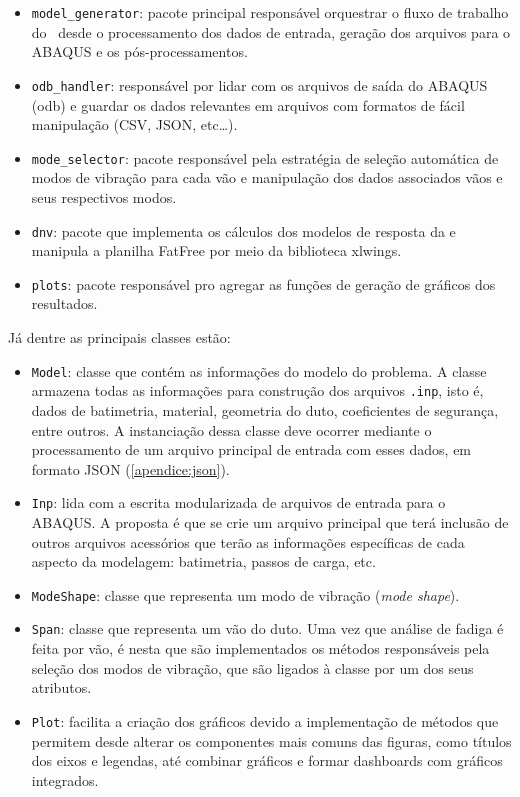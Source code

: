 \begin{itemize}
    \item \texttt{model\_generator}: pacote principal responsável orquestrar o fluxo de trabalho do \frame\ desde o processamento dos dados de entrada, geração dos arquivos para o ABAQUS e os pós-processamentos.

    \item \texttt{odb\_handler}: responsável por lidar com os arquivos de saída do ABAQUS (odb) e guardar os dados relevantes em arquivos com formatos de fácil manipulação (CSV, JSON, etc\ldots).

    \item \texttt{mode\_selector}: pacote responsável pela estratégia de seleção automática de modos de vibração para cada vão e manipulação dos dados associados vãos e seus respectivos modos.

    \item \texttt{dnv}: pacote que implementa os cálculos dos modelos de resposta da  e manipula a planilha FatFree por meio da biblioteca xlwings.

    \item \texttt{plots}: pacote responsável pro agregar as funções de geração de gráficos dos resultados.
\end{itemize}

Já dentre as principais classes estão:

\begin{itemize}
    \item \texttt{Model}: classe que contém as informações do modelo do problema.
    A classe armazena todas as informações para construção dos arquivos \texttt{.inp}, isto é, dados de batimetria, material, geometria do duto, coeficientes de segurança, entre outros.
    A instanciação dessa classe deve ocorrer mediante o processamento de um arquivo principal de entrada com esses dados, em formato JSON (\autoref{apendice:json}).

    \item \texttt{Inp}: lida com a escrita modularizada de arquivos de entrada  para o ABAQUS. A proposta é que se crie um arquivo principal que terá inclusão de outros arquivos acessórios que terão as informações específicas de cada aspecto da modelagem: batimetria, passos de carga, etc.

    \item \texttt{ModeShape}: classe que representa um modo de vibração (\textit{mode shape}).

    \item \texttt{Span}: classe que representa um vão do duto. Uma vez que análise de fadiga é feita por vão, é nesta que são implementados os métodos responsáveis pela seleção dos modos de vibração, que são ligados à classe por um dos seus atributos.

    \item \texttt{Plot}: facilita a criação dos gráficos devido a implementação de métodos que permitem desde alterar os componentes mais comuns das figuras, como títulos dos eixos e legendas, até combinar gráficos e formar dashboards com gráficos integrados.
\end{itemize}

